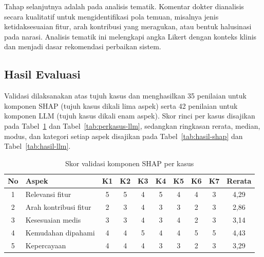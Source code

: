 Tahap selanjutnya adalah pada analisis tematik. Komentar dokter dianalisis secara kualitatif untuk
mengidentifikasi pola temuan, misalnya jenis ketidaksesuaian fitur, arah kontribusi
yang meragukan, atau bentuk halusinasi pada narasi. Analisis tematik ini melengkapi
angka Likert dengan konteks klinis dan menjadi dasar rekomendasi perbaikan sistem.

\subsection{Hasil Evaluasi}
\label{sec:hasil-evaluasi}
Validasi dilaksanakan atas tujuh kasus dan menghasilkan 35 penilaian untuk komponen
SHAP (tujuh kasus dikali lima aspek) serta 42 penilaian untuk komponen LLM (tujuh kasus
dikali enam aspek). Skor rinci per kasus disajikan pada Tabel~\ref{tab:perkasus-shap}
dan Tabel~\ref{tab:perkasus-llm}, sedangkan ringkasan rerata, median, modus, dan
kategori setiap aspek disajikan pada Tabel~\ref{tab:hasil-shap} dan
Tabel~\ref{tab:hasil-llm}.

\begin{table}[htbp]
\centering
\caption{Skor validasi komponen SHAP per kasus}
\label{tab:perkasus-shap}
\small
\begin{tabular}{@{}clcccccccc@{}}
\toprule
\textbf{No} & \textbf{Aspek} & \textbf{K1} & \textbf{K2} & \textbf{K3} & \textbf{K4} & \textbf{K5} & \textbf{K6} & \textbf{K7} & \textbf{Rerata} \\
\midrule
1 & Relevansi fitur        & 5 & 5 & 4 & 5 & 4 & 4 & 3 & 4,29 \\
2 & Arah kontribusi fitur  & 2 & 3 & 4 & 3 & 3 & 2 & 3 & 2,86 \\
3 & Kesesuaian medis       & 3 & 3 & 4 & 3 & 4 & 2 & 3 & 3,14 \\
4 & Kemudahan dipahami     & 4 & 4 & 5 & 4 & 4 & 5 & 5 & 4,43 \\
5 & Kepercayaan            & 4 & 4 & 4 & 3 & 3 & 2 & 3 & 3,29 \\
\bottomrule
\end{tabular}
\end{table}

